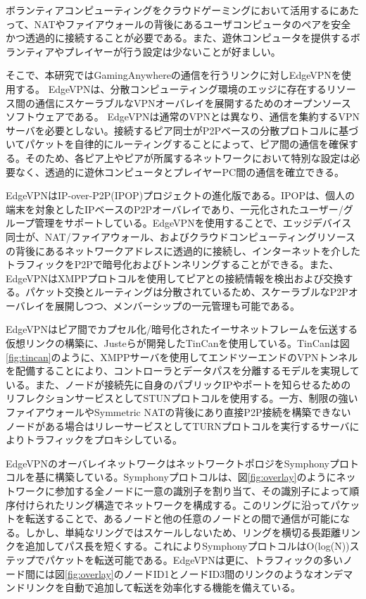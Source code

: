 ボランティアコンピューティングをクラウドゲーミングにおいて活用するにあたって、NATやファイアウォールの背後にあるユーザコンピュータのペアを安全かつ透過的に接続することが必要である。また、遊休コンピュータを提供するボランティアやプレイヤーが行う設定は少ないことが好ましい。

そこで、本研究ではGamingAnywhereの通信を行うリンクに対しEdgeVPN\cite{edgevpn}を使用する。
EdgeVPNは、分散コンピューティング環境のエッジに存在するリソース間の通信にスケーラブルなVPNオーバレイを展開するためのオープンソースソフトウェアである。
EdgeVPNは通常のVPNとは異なり、通信を集約するVPNサーバを必要としない。接続するピア同士がP2Pベースの分散プロトコルに基づいてパケットを自律的にルーティングすることによって、ピア間の通信を確保する。そのため、各ピア上やピアが所属するネットワークにおいて特別な設定は必要なく、透過的に遊休コンピュータとプレイヤーPC間の通信を確立できる。

EdgeVPNはIP-over-P2P(IPOP)プロジェクト\cite{ipop}の進化版である。IPOPは、個人の端末を対象としたIPベースのP2Pオーバレイであり、一元化されたユーザー/グループ管理をサポートしている。EdgeVPNを使用することで、エッジデバイス同士が、NAT/ファイアウォール、およびクラウドコンピューティングリソースの背後にあるネットワークアドレスに透過的に接続し、インターネットを介したトラフィックをP2Pで暗号化およびトンネリングすることができる。また、EdgeVPNはXMPPプロトコル\cite{xmpp}を使用してピアとの接続情報を検出および交換する。パケット交換とルーティングは分散されているため、スケーラブルなP2Pオーバレイを展開しつつ、メンバーシップの一元管理も可能である。

EdgeVPNはピア間でカプセル化/暗号化されたイーサネットフレームを伝送する仮想リンクの構築に、Justeら\cite{tincan}が開発したTinCanを使用している。TinCanは図\ref{fig:tincan}のように、XMPPサーバを使用してエンドツーエンドのVPNトンネルを配備することにより、コントローラとデータパスを分離するモデルを実現している。また、ノードが接続先に自身のパブリックIPやポートを知らせるためのリフレクションサービスとしてSTUNプロトコル\cite{stun}を使用する。一方、制限の強いファイアウォールやSymmetric NATの背後にあり直接P2P接続を構築できないノードがある場合はリレーサービスとしてTURNプロトコル\cite{turn}を実行するサーバによりトラフィックをプロキシしている。

EdgeVPNのオーバレイネットワークはネットワークトポロジをSymphonyプロトコル\cite{symphony}を基に構築している。Symphonyプロトコルは、図\ref{fig:overlay}のようにネットワークに参加する全ノードに一意の識別子を割り当て、その識別子によって順序付けられたリング構造でネットワークを構成する。このリングに沿ってパケットを転送することで、あるノードと他の任意のノードとの間で通信が可能になる。しかし、単純なリングではスケールしないため、リングを横切る長距離リンクを追加してパス長を短くする。これによりSymphonyプロトコルはO(log(N))ステップでパケットを転送可能である。EdgeVPNは更に、トラフィックの多いノード間には図\ref{fig:overlay}のノードID1とノードID3間のリンクのようなオンデマンドリンクを自動で追加して転送を効率化する機能を備えている。

